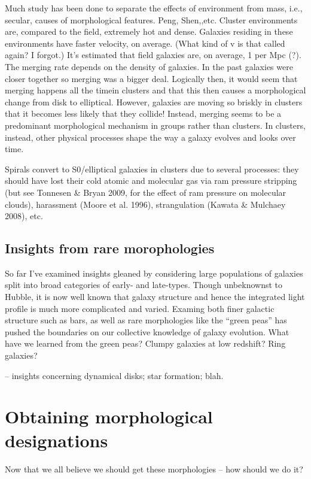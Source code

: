 Much study has been done to separate the effects of environment from mass, i.e., secular, causes of morphological features. Peng, Shen,,etc. Cluster environments are, compared to the field, extremely hot and dense. Galaxies residing in these environments have faster velocity, on average. (What kind of v is that called again? I forgot.)  It's estimated that field galaxies are, on average, 1 per Mpc (?). The merging rate depends on the density of galaxies. In the past galaxies were closer together so merging was a bigger deal. Logically then, it would seem that merging happens all the timein clusters and that this then causes a morphological change from disk to elliptical. However, galaxies are moving so briskly in clusters that it becomes less likely that they collide! Instead, merging seems to be a predominant morphological mechanism in groups rather than clusters. In clusters, instead, other physical processes shape the way a galaxy evolves and looks over time. 

Spirals convert to S0/elliptical galaxies in clusters due to several processes: they should have lost their cold atomic and molecular gas via ram pressure stripping (but see Tonnesen \& Bryan 2009, for the effect of ram
pressure on molecular clouds), harassment (Moore et al. 1996),
strangulation (Kawata \& Mulchaey 2008), etc.



\subsection{Insights from rare morophologies}
So far I've examined insights gleaned by considering large populations of galaxies split into broad categories of early- and late-types. Though unbeknownst to Hubble, it is now well known that galaxy structure and hence the integrated light profile is much more complicated and varied. Examing both finer galactic structure such as bars, as well as rare morphologies like the ``green peas'' has pushed the boundaries on our collective knowledge of galaxy evolution. What have we learned from the green peas? Clumpy galaxies at low redshift? Ring galaxies? 

-- insights concerning dynamical disks; star formation; blah. 


\section{Obtaining morphological designations}
Now that we all believe we should get these morphologies -- how should we do it? 


